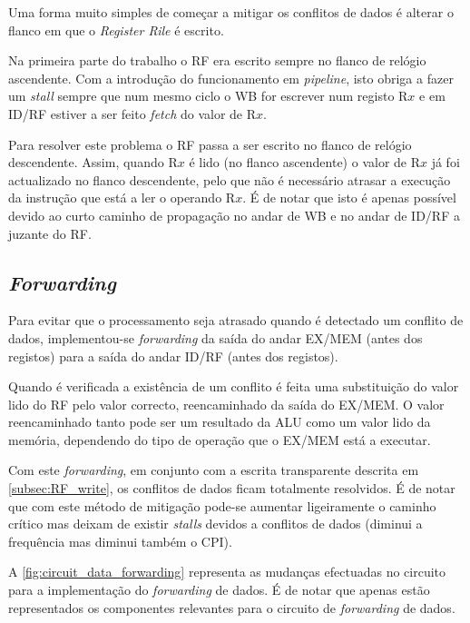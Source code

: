 \documentclass[a4paper]{article}
\begin{document}
	Uma forma muito simples de começar a mitigar os conflitos de dados é alterar o flanco em que o \textit{Register Rile} é escrito.
	
	Na primeira parte do trabalho o RF era escrito sempre no flanco de relógio ascendente. Com a introdução do funcionamento em \textit{pipeline}, isto obriga a fazer um \textit{stall} sempre que num mesmo ciclo o WB for escrever num registo R$x$ e em ID/RF estiver a ser feito \textit{fetch} do valor de R$x$.
	
	Para resolver este problema o RF passa a ser escrito no flanco de relógio descendente. Assim, quando R$x$ é lido (no flanco ascendente) o valor de R$x$ já foi actualizado no flanco descendente, pelo que não é necessário atrasar a execução da instrução que está a ler o operando R$x$. É de notar que isto é apenas possível devido ao curto caminho de propagação no andar de WB e no andar de ID/RF a juzante do RF.
	
	\subsection{\textit{Forwarding}}
	
	Para evitar que o processamento seja atrasado quando é detectado um conflito de dados, implementou-se \textit{forwarding} da saída do andar EX/MEM (antes dos registos) para a saída do andar ID/RF (antes dos registos).
	
	Quando é verificada a existência de um conflito é feita uma substituição do valor lido do RF pelo valor correcto, reencaminhado da saída do EX/MEM. O valor reencaminhado tanto pode ser um resultado da ALU como um valor lido da memória, dependendo do tipo de operação que o EX/MEM está a executar.
	
	Com este \textit{forwarding}, em conjunto com a escrita transparente descrita em \ref{subsec:RF_write}, os conflitos de dados ficam totalmente resolvidos. É de notar que com este método de mitigação pode-se aumentar ligeiramente o caminho crítico mas deixam de existir \textit{stalls} devidos a conflitos de dados (diminui a frequência mas diminui também o CPI).
	
	A \autoref{fig:circuit_data_forwarding} representa as mudanças efectuadas no circuito para a implementação do \textit{forwarding} de dados. É de notar que apenas estão representados os componentes relevantes para o circuito de \textit{forwarding} de dados.
	
\end{document}
